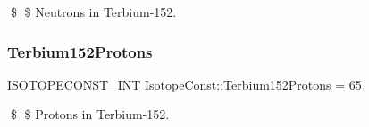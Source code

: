 \$ \$ Neutrons in Terbium-\/152. \mbox{\label{group___isotope_const-_terbium-_tb152_ga96676ed9d2f7e475e2cee77dff170939}} 
\subsubsection{\texorpdfstring{Terbium152\+Protons}{Terbium152Protons}}
{\footnotesize\ttfamily \mbox{\hyperlink{group___isotope_const-_macros_ga5f18360b3e99483a35c32d789e62621c}{I\+S\+O\+T\+O\+P\+E\+C\+O\+N\+S\+T\+\_\+\+I\+NT}} Isotope\+Const\+::\+Terbium152\+Protons = 65}

\$ \$ Protons in Terbium-\/152. 